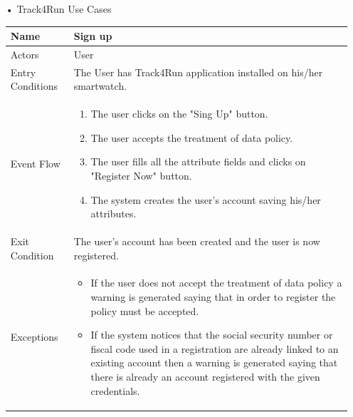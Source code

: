 \begin{enumerate}
\FloatBarrier
\item[•]{\Large Track4Run Use Cases}
\begin{table}[h]
\begin{tabular}{|l|l|}
\hline
Name             & Sign up \\ \hline
Actors           & User  \\ \hline
Entry Conditions & The User has Track4Run application installed on his/her smartwatch.    \\ \hline
Event Flow       & \parbox{.45\textwidth}{\begin{enumerate}
            \item The user clicks on the "Sing Up" button.
            \item The user accepts the treatment of data policy.
            \item The user fills all the attribute fields and clicks on "Register Now" button.
            \item The system creates the user's account saving his/her attributes.
        \end{enumerate}}\\ \hline
Exit Condition   & The user's account has been created and the user is now registered.\\ \hline
Exceptions       & \parbox{.45\textwidth}  
{\begin{itemize}
\item If the user does not accept the treatment of data policy a warning is generated saying that in order to register the policy must be accepted.
\item If the system notices that the social security number or fiscal code used in a registration are already linked to an existing account then a warning is generated saying that there is already an account registered with the given credentials.
\end{itemize}}\\ \hline
\end{tabular}
\end{table}
\FloatBarrier


\end{enumerate}
